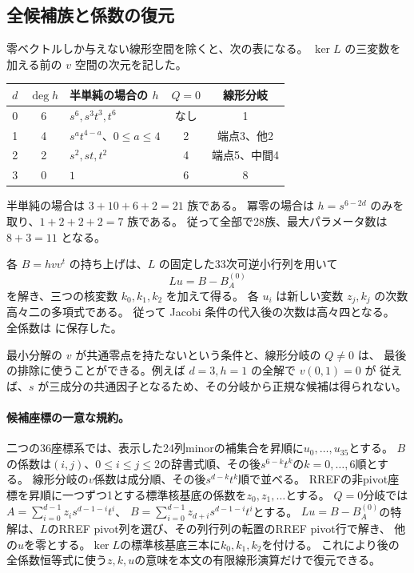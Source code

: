 \documentclass[11pt,a4paper]{ltjsarticle}
\theoremstyle{remark}\newtheorem{remark}[theorem]{注意}
\begin{document}
\subsection{全候補族と係数の復元}

零ベクトルしか与えない線形空間を除くと、次の表になる。
$\ker L$ の三変数を加える前の $v$ 空間の次元を記した。
\begin{center}
\begin{tabular}{cclcc}
\toprule
$d$ & $\deg h$ & 半単純の場合の $h$ & $Q=0$ & 線形分岐\\\midrule
0&6&$s^6,s^3t^3,t^6$ &なし&1\\
1&4&$s^at^{4-a}$、$0\le a\le4$ &2&端点3、他2\\
2&2&$s^2,st,t^2$ &4&端点5、中間4\\
3&0&$1$ &6&8\\\bottomrule
\end{tabular}
\end{center}
半単純の場合は $3+10+6+2=21$ 族である。
冪零の場合は $h=s^{6-2d}$ のみを取り、$1+2+2+2=7$ 族である。
従って全部で28族、最大パラメータ数は $8+3=11$ となる。

各 $B=hvv^t$ の持ち上げは、$L$ の固定した33次可逆小行列を用いて
\[
 Lu=B-B_A^{(0)}
\]
を解き、三つの核変数 $k_0,k_1,k_2$ を加えて得る。
各 $u_i$ は新しい変数 $z_j,k_j$ の次数高々二の多項式である。
従って Jacobi 条件の代入後の次数は高々四となる。
全係数は  に保存した。

最小分解の $v$ が共通零点を持たないという条件と、線形分岐の $Q\ne0$ は、
最後の排除に使うことができる。例えば $d=3,h=1$ の全解で $v(0,1)=0$ が
従えば、$s$ が三成分の共通因子となるため、その分岐から正規な候補は得られない。


\paragraph{候補座標の一意な規約。}
二つの36座標系では、表示した24列minorの補集合を昇順に$u_0,\ldots,u_{35}$とする。
$B$の係数は$(i,j)$、$0\le i\le j\le2$の辞書式順、その後$s^{6-k}t^k$の$k=0,\ldots,6$順とする。
線形分岐の$v$係数は成分順、その後$s^{d-k}t^k$順で並べる。
RREFの非pivot座標を昇順に一つずつ1とする標準核基底の係数を$z_0,z_1,\ldots$とする。
$Q=0$分岐では$A=\sum_{i=0}^{d-1}z_i s^{d-1-i}t^i$、
$B=\sum_{i=0}^{d-1}z_{d+i}s^{d-1-i}t^i$とする。
$Lu=B-B_A^{(0)}$の特解は、$L$のRREF pivot列を選び、その列行列の転置のRREF pivot行で解き、
他の$u$を零とする。$\ker L$の標準核基底三本に$k_0,k_1,k_2$を付ける。
これにより後の全係数恒等式に使う$z,k,u$の意味を本文の有限線形演算だけで復元できる。
\end{document}
